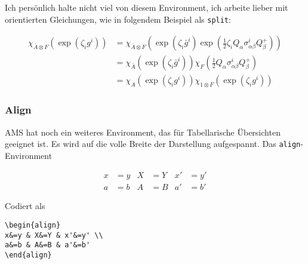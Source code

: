 Ich persönlich halte nicht viel von diesem Environment, ich arbeite lieber mit orientierten Gleichungen, wie in folgendem Beispiel als \texttt{split}:

\begin{equation}
\begin{split}
\chi_{\bar{A}\otimes F}(\exp(\zeta_i g^i)) &= \chi_{\bar{A}\otimes F}\left( \exp(\zeta_i \bar{g}^i) \exp(\frac{1}{2} \zeta_i Q_\alpha \sigma^i_{\alpha \beta} Q^+_\beta)\right) \\
&= \chi_{\bar{A}}\left( \exp(\zeta_i \bar{g}^i) \right) \chi_F \left( \frac{1}{2} Q_\alpha \sigma^i_{\alpha \beta} Q^+_\beta \right) \\
&= \chi_A \left( \exp (\zeta_i g^i) \right) \chi_{1\otimes F} \left( \exp(\zeta_i g^i) \right)
\end{split}
\end{equation}

\subsubsection{Align}

AMS hat noch ein weiteres Environment, das für Tabellarische Übersichten geeignet ist. Es wird auf die volle Breite der Darstellung aufgespannt. Das \texttt{align}-Environment

\begin{align}
x&=y & X&=Y & x'&=y' \\
a&=b & A&=B & a'&=b'
\end{align}

Codiert als 

\begin{verbatim}
\begin{align}
x&=y & X&=Y & x'&=y' \\
a&=b & A&=B & a'&=b'
\end{align}
\end{verbatim}

